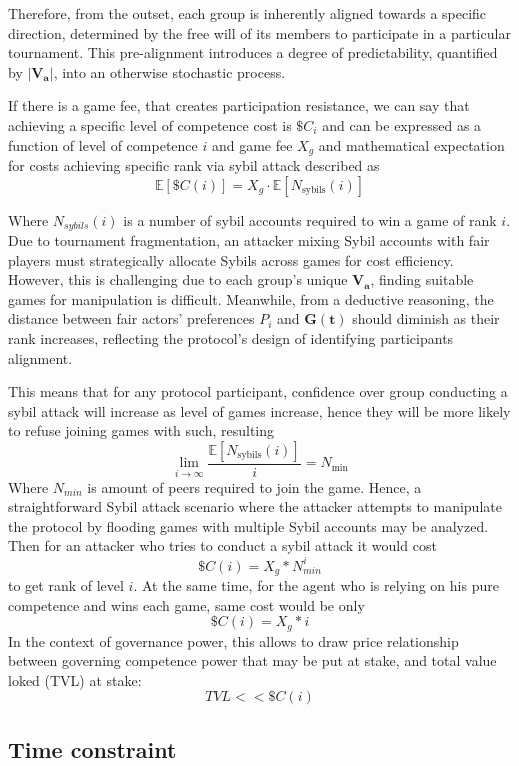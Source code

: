 \documentclass{article}
\begin{document}
\begin{CJK}{UTF8}{gbsn}
\begin{multicols}{2}
        Therefore, from the outset, each group is inherently aligned towards a specific direction, determined by the free will of its members to participate in a particular tournament. This pre-alignment introduces a degree of predictability, quantified by $|\mathbf{V_a}|$, into an otherwise stochastic process.


        If there is a game fee, that creates participation resistance, we can say that achieving a specific level of competence cost is $\$C_i$ and can be expressed as a function of level of competence $i$ and game fee $X_g$ and mathematical expectation for costs achieving specific rank via sybil attack described as
        $$\mathbb{E}[\$C(i)] = X_g \cdot \mathbb{E}[N_{\text{sybils}}(i)]$$


        Where $N_{sybils}(i)$ is a number of sybil accounts required to win a game of rank $i$. Due to tournament fragmentation, an attacker mixing Sybil accounts with fair players must strategically allocate Sybils across games for cost efficiency. However, this is challenging due to each group's unique $\mathbf{V_a}$, finding suitable games for manipulation is difficult.  Meanwhile, from a deductive reasoning, the distance between fair actors' preferences $P_i$ and $\mathbf{G(t)}$ should diminish as their rank increases, reflecting the protocol's design of identifying participants alignment.

        This means that for any protocol participant, confidence over group conducting a sybil attack will increase as level of games increase, hence they will be more likely to refuse joining games with such, resulting $$\lim_{i \to \infty} \frac{\mathbb{E}[N_{\text{sybils}}(i)]}{i} = N_{\text{min}}$$ Where $N_{min}$ is amount of peers required to join the game. Hence, a straightforward Sybil attack scenario where the attacker attempts to manipulate the protocol by flooding games with multiple Sybil accounts may be analyzed.
         Then for an attacker who tries to conduct a sybil attack it would cost
        $$\$C(i) = X_g*N_{min}^i$$ to get rank of level $i$. At the same time, for the agent who is relying on his pure competence and wins each game, same cost would be only $$\$C(i) = X_g*i$$
        In the context of governance power, this allows to draw price relationship between governing competence power that may be put at stake, and total value loked (TVL) at stake: $$TVL << \$C(i)$$

        \subsection{Time constraint}


\end{multicols}
\end{CJK}
\end{document}
